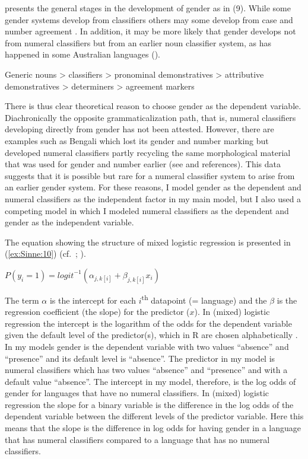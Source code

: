 \documentclass[output=collectionpaper]{langsci/langscibook}
\begin{document}
\citet[451]{Luraghi2011} presents the general stages in the development of gender as in (9). While some gender systems develop from classifiers others may some develop from case and number agreement \citep[452]{Luraghi2011}. In addition, it may be more likely that gender develops not from numeral classifiers but from an earlier noun classifier system, as has happened in some Australian languages (\citealt{Plaster2007}).

\ea
\label{ex:Sinne:9}
Generic nouns > classifiers > pronominal demonstratives > attributive demonstratives > determiners > agreement markers
\z

There is thus clear theoretical reason to choose gender as the dependent variable. Diachronically the opposite grammaticalization path, that is, numeral classifiers developing directly from gender has not been attested. However, there are examples such as Bengali which lost its gender and number marking but developed numeral classifiers partly recycling the same morphological material that was used for gender and number earlier (see \citealt[379]{Aikhenvald2000} and references). This data suggests that it is possible but rare for a numeral classifier system to arise from an earlier gender system. For these reasons, I model gender as the dependent and numeral classifiers as the independent factor in my main model, but I also used a competing model in which I modeled numeral classifiers as the dependent and gender as the independent variable.

The equation showing the structure of mixed logistic regression is presented in (\ref{ex:Sinne:10}) (cf.\ \citealt[279]{Gelman2007}; \citealt[8]{Bentz2013}).

\ea
\label{ex:Sinne:10}
$P(y_{i}=1)={\mathit{logit}}^{-1}({\alpha} _{j,k[i]}+{\beta} _{j,k[i]}{x}_{i})$
\z

The term $\alpha$ is the intercept for each $i$\textsuperscript{th} datapoint (= language) and the $\beta$ is the regression coefficient (the slope) for the predictor ($x$). In (mixed) logistic regression the intercept is the logarithm of the odds for the dependent variable given the default level of the predictor(s), which in R are chosen alphabetically \citep[128]{Arppe2008}. In my models gender is the dependent variable with two values ``absence'' and ``presence'' and its default level is ``absence''. The predictor in my model is numeral classifiers which has two values ``absence'' and ``presence'' and with a default value ``absence''. The intercept in my model, therefore, is the log odds of gender for languages that have no numeral classifiers. In (mixed) logistic regression the slope for a binary variable is the difference in the log odds of the dependent variable between the different levels of the predictor variable. Here this means that the slope is the difference in log odds for having gender in a language that has numeral classifiers compared to a language that has no numeral classifiers.
\end{document}
